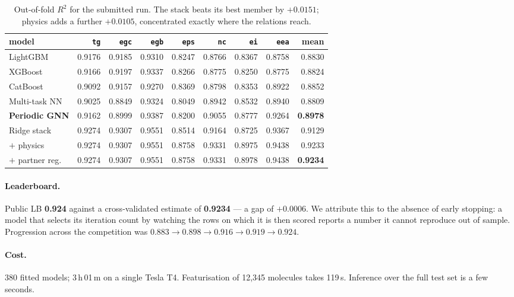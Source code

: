 \documentclass[11pt,a4paper]{article}
\newcommand{\prop}[1]{\texttt{#1}}
\newcommand{\R}{$R^2$}
\begin{document}
\begin{table}[h]
\centering
\small
\begin{tabular}{lrrrrrrrr}
\toprule
model & \prop{tg} & \prop{egc} & \prop{egb} & \prop{eps} & \prop{nc} & \prop{ei} & \prop{eea} & \textbf{mean} \\
\midrule
LightGBM      & 0.9176 & 0.9185 & 0.9310 & 0.8247 & 0.8766 & 0.8367 & 0.8758 & 0.8830 \\
XGBoost       & 0.9166 & 0.9197 & 0.9337 & 0.8266 & 0.8775 & 0.8250 & 0.8775 & 0.8824 \\
CatBoost      & 0.9092 & 0.9157 & 0.9270 & 0.8369 & 0.8798 & 0.8353 & 0.8922 & 0.8852 \\
Multi-task NN & 0.9025 & 0.8849 & 0.9324 & 0.8049 & 0.8942 & 0.8532 & 0.8940 & 0.8809 \\
\textbf{Periodic GNN} & 0.9162 & 0.8999 & 0.9387 & 0.8200 & 0.9055 & 0.8777 & 0.9264 & \textbf{0.8978} \\
\midrule
Ridge stack   & 0.9274 & 0.9307 & 0.9551 & 0.8514 & 0.9164 & 0.8725 & 0.9367 & 0.9129 \\
$+$ physics   & 0.9274 & 0.9307 & 0.9551 & 0.8758 & 0.9331 & 0.8975 & 0.9438 & 0.9233 \\
$+$ partner reg. & 0.9274 & 0.9307 & 0.9551 & 0.8758 & 0.9331 & 0.8978 & 0.9438 & \textbf{0.9234} \\
\bottomrule
\end{tabular}
\caption{Out-of-fold \R{} for the submitted run. The stack beats its best member
by $+0.0151$; physics adds a further $+0.0105$, concentrated exactly where the
relations reach.}
\label{tab:oof}
\end{table}

\paragraph{Leaderboard.} Public LB \textbf{0.924} against a cross-validated
estimate of \textbf{0.9234} --- a gap of $+0.0006$. We attribute this to the
absence of early stopping: a model that selects its iteration count by watching
the rows on which it is then scored reports a number it cannot reproduce out of
sample. Progression across the competition was
$0.883 \rightarrow 0.898 \rightarrow 0.916 \rightarrow 0.919 \rightarrow 0.924$.

\paragraph{Cost.} 380 fitted models; 3\,h\,01\,m on a single Tesla T4.
Featurisation of 12{,}345 molecules takes 119\,s. Inference over the full test
set is a few seconds.
\end{document}
